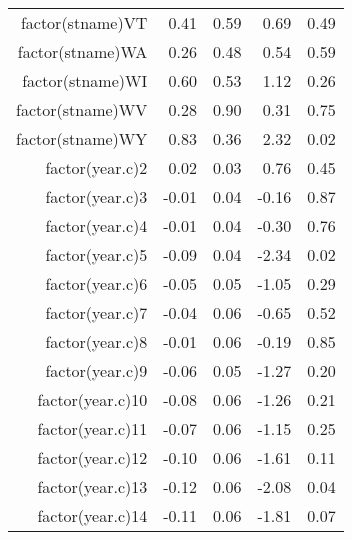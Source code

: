 \begin{table}[ht]
\begin{tabular}{rrrrr}
  factor(stname)VT & 0.41 & 0.59 & 0.69 & 0.49 \\ 
  factor(stname)WA & 0.26 & 0.48 & 0.54 & 0.59 \\ 
  factor(stname)WI & 0.60 & 0.53 & 1.12 & 0.26 \\ 
  factor(stname)WV & 0.28 & 0.90 & 0.31 & 0.75 \\ 
  factor(stname)WY & 0.83 & 0.36 & 2.32 & 0.02 \\ 
  factor(year.c)2 & 0.02 & 0.03 & 0.76 & 0.45 \\ 
  factor(year.c)3 & -0.01 & 0.04 & -0.16 & 0.87 \\ 
  factor(year.c)4 & -0.01 & 0.04 & -0.30 & 0.76 \\ 
  factor(year.c)5 & -0.09 & 0.04 & -2.34 & 0.02 \\ 
  factor(year.c)6 & -0.05 & 0.05 & -1.05 & 0.29 \\ 
  factor(year.c)7 & -0.04 & 0.06 & -0.65 & 0.52 \\ 
  factor(year.c)8 & -0.01 & 0.06 & -0.19 & 0.85 \\ 
  factor(year.c)9 & -0.06 & 0.05 & -1.27 & 0.20 \\ 
  factor(year.c)10 & -0.08 & 0.06 & -1.26 & 0.21 \\ 
  factor(year.c)11 & -0.07 & 0.06 & -1.15 & 0.25 \\ 
  factor(year.c)12 & -0.10 & 0.06 & -1.61 & 0.11 \\ 
  factor(year.c)13 & -0.12 & 0.06 & -2.08 & 0.04 \\ 
  factor(year.c)14 & -0.11 & 0.06 & -1.81 & 0.07 \\ 
   \hline
\end{tabular}
\end{table}
